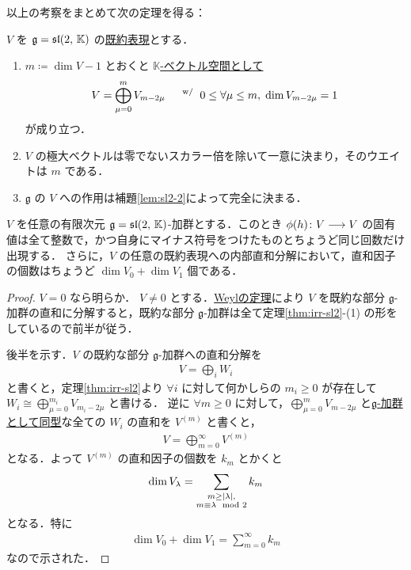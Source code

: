 \documentclass[rep_main]{subfiles}
\begin{document}
以上の考察をまとめて次の定理を得る：

\begin{mytheo}[label=thm:irr-sl2,breakable]{}
	$V$ を $\mathfrak{g} = \mathfrak{sl}(2,\, \mathbb{K})$ の\hyperref[def:irr]{既約表現}とする．
	\begin{enumerate}
		\item $m \coloneqq \dim V - 1$ とおくと \underline{$\mathbb{K}$-ベクトル空間として}
		\begin{align}
			V = \bigoplus_{\mu = 0}^m V_{m-2\mu}\quad \mathrel{} {}^{\mathrm{w}/} \mathrel{} 0 \le \forall \mu \le m,\; \dim V_{m - 2\mu} = 1
		\end{align}
		が成り立つ．
		\item $V$ の極大ベクトルは零でないスカラー倍を除いて一意に決まり，そのウエイトは $m$ である．
		\item $\mathfrak{g}$ の $V$ への作用は補題\ref{lem:sl2-2}によって完全に決まる．
	\end{enumerate}
\end{mytheo}

\begin{mycol}[label=col:sl2]{}
	$V$ を任意の有限次元 $\mathfrak{g} = \mathfrak{sl}(2,\, \mathbb{K})$-加群とする．このとき $\phi(h) \colon V \longrightarrow V$  の固有値は全て整数で，かつ自身にマイナス符号をつけたものとちょうど同じ回数だけ出現する．
	さらに，$V$ の任意の既約表現への内部直和分解において，直和因子の個数はちょうど $\dim V_0 + \dim V_1$ 個である．
\end{mycol}

\begin{proof}
	$V = 0$ なら明らか．
	$V \neq 0$ とする．\hyperref[thm:Weyl]{Weylの定理}により $V$ を既約な部分 $\mathfrak{g}$-加群の直和に分解すると，既約な部分 $\mathfrak{g}$-加群は全て定理\ref{thm:irr-sl2}-(1) の形をしているので前半が従う．

	後半を示す．$V$ の既約な部分 $\mathfrak{g}$-加群への直和分解を
	\begin{align}
		V = \bigoplus_i W_i
	\end{align}
	と書くと，定理\ref{thm:irr-sl2}より $\forall i$ に対して何かしらの $m_i \ge 0$ が存在して $W_i \cong \bigoplus_{\mu = 0}^{m_i} V_{m_i - 2\mu}$ と書ける．
	逆に $\forall m \ge 0$ に対して，$\bigoplus_{\mu = 0}^{m} V_{m - 2\mu}$ と\hyperref[def:gmod-hom]{$\mathfrak{g}$-加群として同型}な全ての $W_i$ の直和を $V^{(m)}$ と書くと，
	\begin{align}
		V = \bigoplus_{m=0}^\infty V^{(m)}
	\end{align}
	となる．よって $V^{(m)}$ の直和因子の個数を $k_m$ とかくと
	\begin{align}
		\dim V_\lambda = \sum_{\substack{m \ge \abs{\lambda}, \\ m \equiv \lambda \mod 2}} k_m
	\end{align}
	となる．特に
	\begin{align}
		\dim V_0 + \dim V_1 = \sum_{m=0}^\infty k_m
	\end{align}
	なので示された．
\end{proof}
\end{document}
